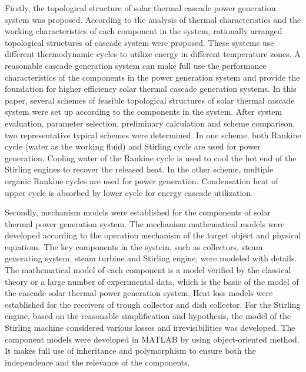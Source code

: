 {Firstly, the topological structure of solar thermal cascade power generation system was proposed. According to the analysis of thermal characteristics and the working characteristics of each component in the system, rationally arranged topological structures of cascade system were proposed. These systems use different thermodynamic cycles to utilize energy in different temperature zones. A reasonable cascade generation system can make full use the performance characteristics of the components in the power generation system and provide the foundation for higher efficiency solar thermal cascade generation systems. In this paper, several schemes of feasible topological structures of solar thermal cascade system were set up according to the components in the system. After system evaluation, parameter selection, preliminary calculation and scheme comparison, two representative typical schemes were determined. In one scheme, both Rankine cycle (water as the working fluid) and Stirling cycle are used for power generation. Cooling water of the Rankine cycle is used to cool the hot end of the Stirling engines to recover the released heat. In the other scheme, multiple organic Rankine cycles are used for power generation. Condensation heat of upper cycle is absorbed by lower cycle for energy cascade utilization.


Secondly, mechanism models were established for the components of solar thermal power generation system. The mechanism mathematical models were developed according to the operation mechanism of the target object and physical equations. The key components in the system, such as collectors, steam generating system, steam turbine and Stirling engine, were modeled with details. The mathematical model of each component is a model verified by the classical theory or a large number of experimental data, which is the basic of the model of the cascade solar thermal power generation system. Heat loss models were established for the receivers of trough collector and dish collector. For the Stirling engine, based on the reasonable simplification and hypothesis, the model of the Stirling machine considered various losses and irrevisibilities was developed. The component models were developed in MATLAB by using object-oriented method. It makes full use of inheritance and polymorphism to ensure both the independence and the relevance of the components.

}
